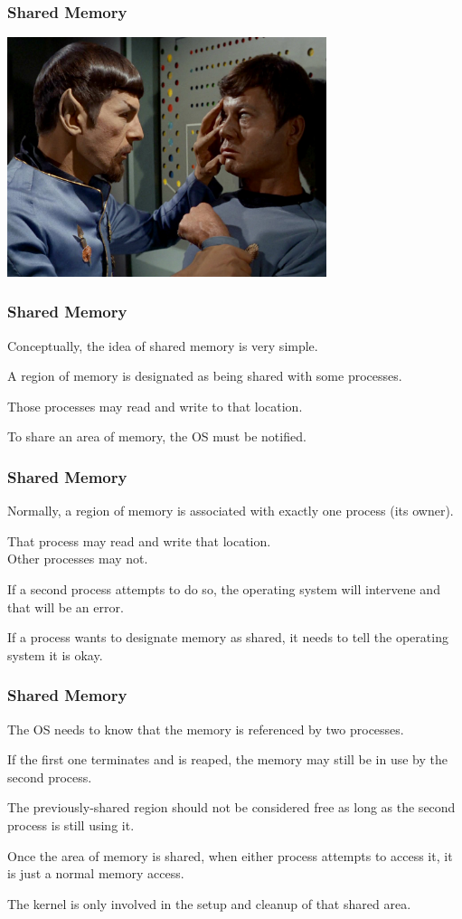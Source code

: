 \begin{frame}
	\frametitle{Shared Memory}
	\begin{center}
		\includegraphics[width=0.7\textwidth]{images/mindmeld.jpg}
	\end{center}

\end{frame}


\begin{frame}
	\frametitle{Shared Memory}

	Conceptually, the idea of shared memory is very simple.

	A region of memory is designated as being shared with some processes.

	Those processes may read and write to that location.

	To share an area of memory, the OS must be notified.

\end{frame}

\begin{frame}
	\frametitle{Shared Memory}
	Normally, a region of memory is associated with exactly one process (its owner).

	That process may read and write that location.\\
	\quad Other processes may not.

	If a second process attempts to do so, the operating system will intervene and that will be an error.

	If a process wants to designate memory as shared, it needs to tell the operating system it is okay.

\end{frame}

\begin{frame}
	\frametitle{Shared Memory}

	The OS needs to know that the memory is referenced by two processes.

	If the first one terminates and is reaped, the memory may still be in use by the second process.

	The previously-shared region should not be considered free as long as the second process is still using it.

	Once the area of memory is shared, when either process attempts to access it, it is just a normal memory access.

	The kernel is only involved in the setup and cleanup of that shared area.

\end{frame}

